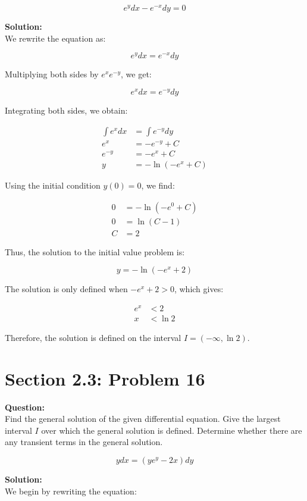 \documentclass[12pt]{article}
\begin{document}
\[
e^{y}dx - e^{-x}dy = 0
\]

\textbf{Solution:} \\
We rewrite the equation as:

\[
e^{y}dx = e^{-x}dy
\]

Multiplying both sides by \( e^{x} e^{-y} \), we get:

\[
e^{x}dx = e^{-y}dy
\]

Integrating both sides, we obtain:

\[
\begin{aligned}
    \int e^{x}dx &= \int e^{-y}dy \\
    e^{x} &= -e^{-y} + C \\
    e^{-y} &= -e^{x} + C \\
    y &= -\ln(-e^{x} + C)
\end{aligned}
\]

Using the initial condition \(y(0) = 0\), we find:

\[
\begin{aligned}
    0 &= -\ln(-e^{0} + C) \\
    0 &= \ln(C - 1) \\
    C &= 2
\end{aligned}
\]

Thus, the solution to the initial value problem is:

\[
y = -\ln(-e^{x} + 2)
\]

The solution is only defined when \( -e^{x} + 2 > 0 \), which gives:

\[
\begin{aligned}
    e^{x} &< 2\\
    x &< \ln 2
\end{aligned}
\]

Therefore, the solution is defined on the interval \(I = (-\infty, \ln 2)\).

\newpage

\section*{Section 2.3: Problem 16}
\raggedright
\textbf{Question:} \\
Find the general solution of the given differential equation. Give the largest interval \(I\) over which the general solution is defined. Determine whether there are any transient terms in the general solution.

\[
ydx = (ye^{y} - 2x)dy
\]

\textbf{Solution:} \\
We begin by rewriting the equation:
\end{document}
